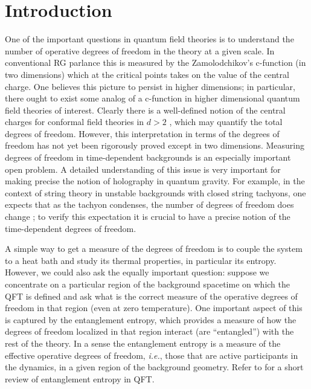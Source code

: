 \documentclass[12pt]{article}
\def\ie{{\it i.e.}}
\begin{document}
\section{Introduction}
 \label{intro}

\hspace{5mm} One of the important questions in quantum field
theories  is to understand the number of operative degrees of
freedom  in the theory at a given scale. In conventional RG parlance
this is measured by the Zamolodchikov's c-function (in two
dimensions) \cite{Zamolodchikov:1986gt}   which at the critical
points takes on the value of the central charge. One believes this
picture to persist in higher dimensions; in particular, there  ought
to exist some analog of a c-function in higher dimensional quantum
field theories of interest. Clearly there is a well-defined notion
of the central charges  for conformal field theories in $d >2$
\cite{Cardy:1988cw}, which may quantify  the total degrees of
freedom. However, this interpretation in terms of the degrees of
freedom has not yet been rigorously proved  except in two
dimensions.  Measuring degrees of freedom in
time-dependent backgrounds is an especially important open problem. A
detailed understanding of this issue   is very important for making
precise the notion of holography in quantum  gravity. For example,
in the context of string theory in unstable backgrounds  with closed
string tachyons, one expects that as the tachyon condenses,  the
number of degrees of freedom does change \cite{Nishioka:2006gr}; to
verify this expectation it is crucial to have a precise notion of
the time-dependent degrees of  freedom.

A simple way to get a measure of the degrees of freedom is to couple
the system
 to a heat bath and study its thermal properties, in particular
its entropy. However, we could  also ask the equally important
question: suppose we concentrate on a particular region of the
background spacetime on which the QFT is defined and ask what is the
correct measure of the operative degrees of freedom in that region
(even at zero temperature).  One important aspect of this is
captured by the entanglement entropy, which provides a measure of
how the degrees of freedom localized in that region interact (are
``entangled'') with the rest of the theory. In a sense the
entanglement entropy is a measure of the effective operative degrees
of freedom, \ie, those that are active participants in the dynamics,
in a given region of the background geometry.  Refer to
\cite{Calabrese:2005zw} for a short review of entanglement entropy
in QFT.
\end{document}
